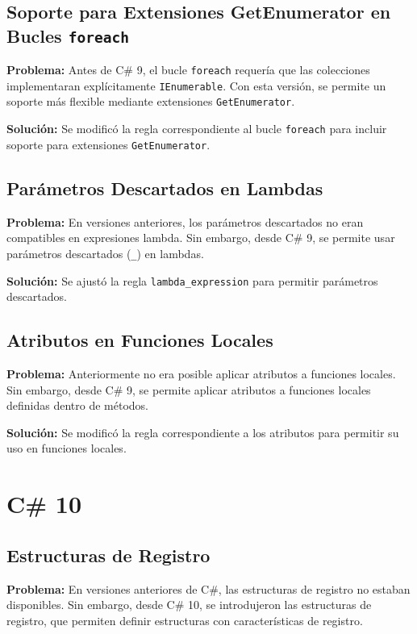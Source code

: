 \subsection{Soporte para Extensiones GetEnumerator en Bucles \texttt{foreach}}

\textbf{Problema:} Antes de C\# 9, el bucle \texttt{foreach} requería que las colecciones implementaran explícitamente \texttt{IEnumerable}. Con esta versión, se permite un soporte más flexible mediante extensiones \texttt{GetEnumerator}.

\textbf{Solución:} Se modificó la regla correspondiente al bucle \texttt{foreach} para incluir soporte para extensiones \texttt{GetEnumerator}.

\subsection{Parámetros Descartados en Lambdas}

\textbf{Problema:} En versiones anteriores, los parámetros descartados no eran compatibles en expresiones lambda. Sin embargo, desde C\# 9, se permite usar parámetros descartados (\texttt{\_}) en lambdas.

\textbf{Solución:} Se ajustó la regla \texttt{lambda\_expression} para permitir parámetros descartados.

\subsection{Atributos en Funciones Locales}

\textbf{Problema:} Anteriormente no era posible aplicar atributos a funciones locales. Sin embargo, desde C\# 9, se permite aplicar atributos a funciones locales definidas dentro de métodos.

\textbf{Solución:} Se modificó la regla correspondiente a los atributos para permitir su uso en funciones locales.

\section{C\# 10}

\subsection{Estructuras de Registro}
\textbf{Problema:} En versiones anteriores de C\#, las estructuras de registro no estaban disponibles. Sin embargo, desde C\# 10, se introdujeron las estructuras de registro, que permiten definir estructuras con características de registro.


